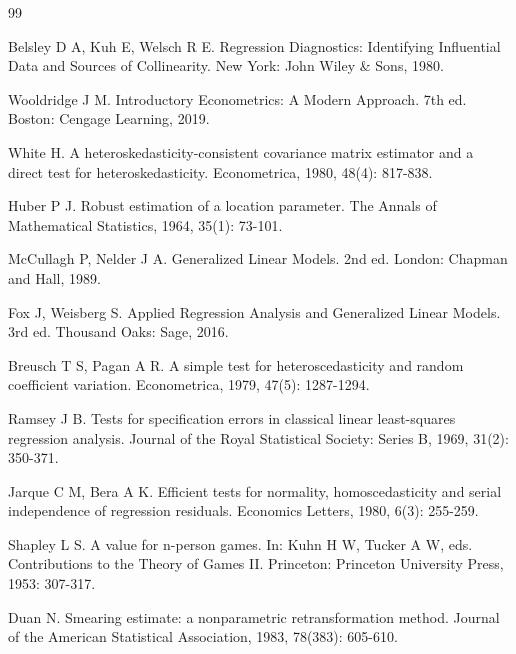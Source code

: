 \begin{thebibliography}{99}

 Belsley D A, Kuh E, Welsch R E. Regression Diagnostics: Identifying Influential Data and Sources of Collinearity. New York: John Wiley \& Sons, 1980.

 Wooldridge J M. Introductory Econometrics: A Modern Approach. 7th ed. Boston: Cengage Learning, 2019.

 White H. A heteroskedasticity-consistent covariance matrix estimator and a direct test for heteroskedasticity. Econometrica, 1980, 48(4): 817-838.

 Huber P J. Robust estimation of a location parameter. The Annals of Mathematical Statistics, 1964, 35(1): 73-101.

 McCullagh P, Nelder J A. Generalized Linear Models. 2nd ed. London: Chapman and Hall, 1989.

 Fox J, Weisberg S. Applied Regression Analysis and Generalized Linear Models. 3rd ed. Thousand Oaks: Sage, 2016.

 Breusch T S, Pagan A R. A simple test for heteroscedasticity and random coefficient variation. Econometrica, 1979, 47(5): 1287-1294.

 Ramsey J B. Tests for specification errors in classical linear least-squares regression analysis. Journal of the Royal Statistical Society: Series B, 1969, 31(2): 350-371.

 Jarque C M, Bera A K. Efficient tests for normality, homoscedasticity and serial independence of regression residuals. Economics Letters, 1980, 6(3): 255-259.

 Shapley L S. A value for n-person games. In: Kuhn H W, Tucker A W, eds. Contributions to the Theory of Games II. Princeton: Princeton University Press, 1953: 307-317.

 Duan N. Smearing estimate: a nonparametric retransformation method. Journal of the American Statistical Association, 1983, 78(383): 605-610.

\end{thebibliography}
